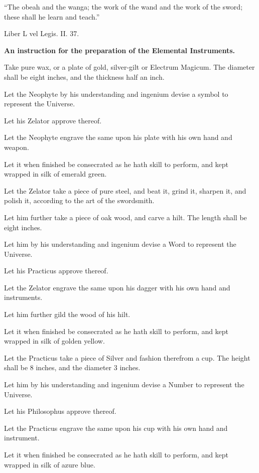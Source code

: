 

\epigraph{\enquote{The obeah and the wanga; the work of the wand and the work of the sword; these shall he learn and teach.}}{Liber L vel Legis. II. 37.}

\textbf{An instruction for the preparation of the Elemental Instruments.}


\begin{description}
\item Take pure wax, or a plate of gold, silver-gilt or Electrum Magicum. The diameter shall be eight inches, and the thickness half an inch.
\item Let the Neophyte by his understanding and ingenium devise a symbol to represent the Universe.
\item Let his Zelator approve thereof.
\item Let the Neophyte engrave the same upon his plate with his own hand and weapon.
\item Let it when finished be consecrated as he hath skill to perform, and kept wrapped in silk of emerald green.
\end{description}


\begin{description}
\item Let the Zelator take a piece of pure steel, and beat it, grind it, sharpen it, and polish it, according to the art of the swordsmith.
\item Let him further take a piece of oak wood, and carve a hilt. The length shall be eight inches.
\item Let him by his understanding and ingenium devise a Word to represent the Universe.
\item Let his Practicus approve thereof.
\item Let the Zelator engrave the same upon his dagger with his own hand and instruments.
\item Let him further gild the wood of his hilt.
\item Let it when finished be consecrated as he hath skill to perform, and kept wrapped in silk of golden yellow.
\end{description}

\begin{description}
\item Let the Practicus take a piece of Silver and fashion therefrom a cup. The height shall be 8 inches, and the diameter 3 inches.
\item Let him by his understanding and ingenium devise a Number to represent the Universe.
\item Let his Philosophus approve thereof.
\item Let the Practicus engrave the same upon his cup with his own hand and instrument.
\item Let it when finished be consecrated as he hath skill to perform, and kept wrapped in silk of azure blue.
\end{description}

